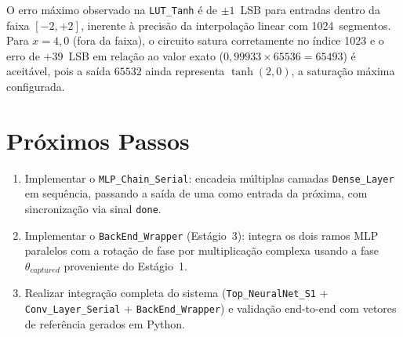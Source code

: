 \documentclass[a4paper,12pt]{article}
\begin{document}
O erro m\'aximo observado na \texttt{LUT\_Tanh} \'e de $\pm 1$~LSB para entradas dentro da faixa $[-2, +2]$, inerente \`a precis\~ao da interpola\c{c}\~ao linear com 1024~segmentos. Para $x = 4{,}0$ (fora da faixa), o circuito satura corretamente no \'indice 1023 e o erro de $+39$~LSB em rela\c{c}\~ao ao valor exato ($0{,}99933 \times 65536 = 65493$) \'e aceit\'avel, pois a sa\'ida $65532$ ainda representa $\tanh(2{,}0)$, a satura\c{c}\~ao m\'axima configurada.


\section{Pr\'oximos Passos}

\begin{enumerate}
    \item Implementar o \texttt{MLP\_Chain\_Serial}: encadeia m\'ultiplas camadas \texttt{Dense\_Layer} em sequ\^encia, passando a sa\'ida de uma como entrada da pr\'oxima, com sincroniza\c{c}\~ao via sinal \texttt{done}.
    \item Implementar o \texttt{BackEnd\_Wrapper} (Est\'agio~3): integra os dois ramos MLP paralelos com a rota\c{c}\~ao de fase por multiplica\c{c}\~ao complexa usando a fase $\theta_{captured}$ proveniente do Est\'agio~1.
    \item Realizar integra\c{c}\~ao completa do sistema (\texttt{Top\_NeuralNet\_S1} + \texttt{Conv\_Layer\_Serial} + \texttt{BackEnd\_Wrapper}) e valida\c{c}\~ao end-to-end com vetores de refer\^encia gerados em Python.
\end{enumerate}
\end{document}
